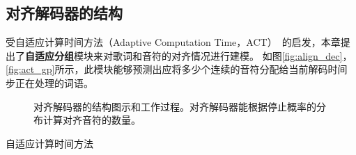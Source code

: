 \subsection{对齐解码器的结构}
受自适应计算时间方法（Adaptive Computation Time，ACT）~\citep{act}的启发，本章提出了\textbf{自适应分组}模块来对歌词和音符的对齐情况进行建模。
如图\ref{fig:align_dec}，\ref{fig:act_gp}所示，此模块能够预测出应将多少个连续的音符分配给当前解码时间步正在处理的词语。
\begin{figure}
  \caption{对齐解码器的结构图示和工作过程。对齐解码器能根据停止概率的分布计算对齐音符的数量。}
\end{figure}
自适应计算时间方法
